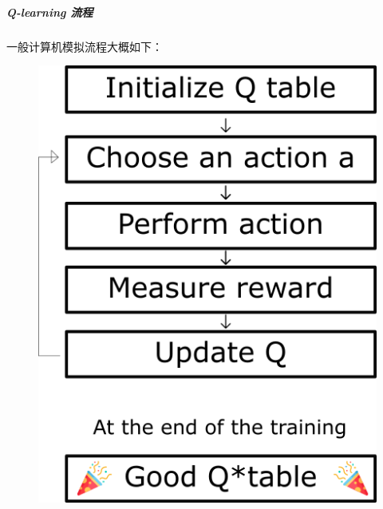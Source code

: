 \documentclass[UTF8,a4paper,12pt]{ctexbook}
\begin{document}
				\subparagraph{Q-learning 流程}
					一般计算机模拟流程大概如下：
					
					\begin{figure}[H]
						\centering
						\includegraphics[width=.4\linewidth]{qFuncProcess}
					\end{figure}
				
\end{document}
